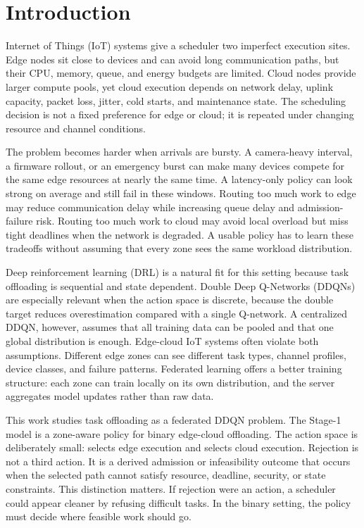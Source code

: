 \section{Introduction}
\label{sec:introduction}

 Internet of Things (IoT) systems give a scheduler two imperfect execution sites. Edge nodes sit close to devices and can avoid long communication paths, but their CPU, memory, queue, and energy budgets are limited. Cloud nodes provide larger compute pools, yet cloud execution depends on network delay, uplink capacity, packet loss, jitter, cold starts, and maintenance state. The scheduling decision is not a fixed preference for edge or cloud; it is repeated under changing resource and channel conditions.

The problem becomes harder when arrivals are bursty. A camera-heavy interval, a firmware rollout, or an emergency burst can make many devices compete for the same edge resources at nearly the same time. A latency-only policy can look strong on average and still fail in these windows. Routing too much work to edge may reduce communication delay while increasing queue delay and admission-failure risk. Routing too much work to cloud may avoid local overload but miss tight deadlines when the network is degraded. A usable policy has to learn these tradeoffs without assuming that every zone sees the same workload distribution.

Deep reinforcement learning (DRL) is a natural fit for this setting because task offloading is sequential and state dependent. Double Deep Q-Networks (DDQNs) are especially relevant when the action space is discrete, because the double target reduces overestimation compared with a single Q-network. A centralized DDQN, however, assumes that all training data can be pooled and that one global distribution is enough. Edge-cloud IoT systems often violate both assumptions. Different edge zones can see different task types, channel profiles, device classes, and failure patterns. Federated learning offers a better training structure: each zone can train locally on its own distribution, and the server aggregates model updates rather than raw data.

This work studies task offloading as a federated DDQN problem. The Stage-1 model is a zone-aware \fedddqn{} policy for binary edge-cloud offloading. The action space is deliberately small: \EdgeAction{} selects edge execution and \CloudAction{} selects cloud execution. Rejection is not a third action. It is a derived admission or infeasibility outcome that occurs when the selected path cannot satisfy resource, deadline, security, or state constraints. This distinction matters. If rejection were an action, a scheduler could appear cleaner by refusing difficult tasks. In the binary setting, the policy must decide where feasible work should go.

